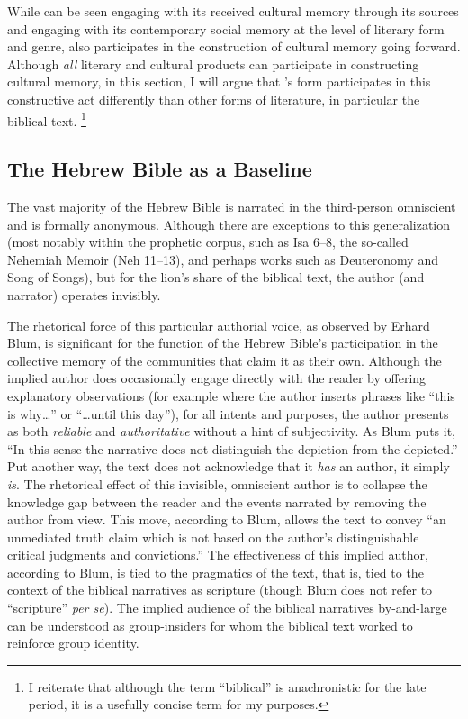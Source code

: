 While \ga can be seen engaging with its received cultural memory through its sources and engaging with its contemporary social memory at the level of literary form and genre, \ga also participates in the construction of cultural memory going forward. Although \emph{all} literary and cultural products can participate in constructing cultural memory, in this section, I will argue that \ga's \psgraphic form participates in this constructive act differently than other forms of literature, in particular the biblical text.%
    \footnote{I reiterate that although the term ``biblical'' is anachronistic for the late \secondtemple period, it is a usefully concise term for my purposes.}

\subsection{The Hebrew Bible as a Baseline}

The vast majority of the Hebrew Bible is narrated in the third-person omniscient and is formally anonymous. Although there are exceptions to this generalization (most notably within the prophetic corpus, such as Isa 6--8, the so-called Nehemiah Memoir (Neh 11--13), and perhaps works such as Deuteronomy and Song of Songs), but for the lion's share of the biblical text, the author (and narrator) operates invisibly.

The rhetorical force of this particular authorial voice, as observed by Erhard Blum, is significant for the function of the Hebrew Bible's participation in the collective memory of the communities that claim it as their own. Although the implied author does occasionally engage directly with the reader by offering explanatory observations (for example where the author inserts phrases like ``this is why\ldots{}'' or ``\ldots{}until this day''), for all intents and purposes, the author presents as both \emph{reliable} and \emph{authoritative} without a hint of subjectivity. As Blum puts it, ``In this sense the narrative does not distinguish the depiction from the depicted.''%
    \autocite[33]{blum_barton-etal2007}
Put another way, the text does not acknowledge that it \emph{has} an author, it simply \emph{is}. The rhetorical effect of this invisible, omniscient author is to collapse the knowledge gap between the reader and the events narrated by removing the author from view. This move, according to Blum, allows the text to convey ``an unmediated truth claim which is not based on the author's distinguishable critical judgments and convictions.''%
    \autocite[33]{blum_barton-etal2007}
The effectiveness of this implied author, according to Blum, is tied to the pragmatics of the text, that is, tied to the context of the biblical narratives as scripture (though Blum does not refer to ``scripture'' \emph{per se}). The implied audience of the biblical narratives by-and-large can be understood as group-insiders for whom the biblical text worked to reinforce group identity.

